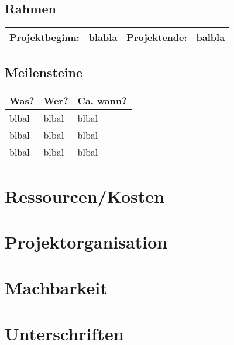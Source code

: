 \subsection{Rahmen}

\begin{tabular}{ | l | l | l | l |}
    \hline
    Projektbeginn: & blabla & Projektende: & balbla \\ \hline
\end{tabular}

\subsection{Meilensteine}

\begin{tabular}{ | l | l | l |}
    \hline
    Was? & Wer? & Ca. wann? \\ \hline
    blbal & blbal & blbal \\ \hline
    blbal & blbal & blbal \\ \hline
    blbal & blbal & blbal \\ \hline
\end{tabular}

\section{Ressourcen/Kosten}

\section{Projektorganisation}

\section{Machbarkeit}

\section{Unterschriften}